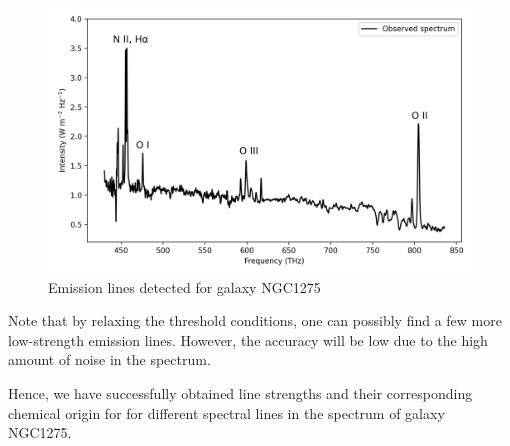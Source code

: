 \begin{figure}[H]
    \centering
    \includegraphics[width=0.7\linewidth]{Figures/3/final.png}
    \caption{Emission lines detected for galaxy NGC1275}
\label{galaxy_summary_pic}
\end{figure}

Note that by relaxing the threshold conditions, one can possibly find a few more low-strength emission lines. However, the accuracy will be low due to the high amount of noise in the spectrum.

Hence, we have successfully obtained line strengths and their corresponding chemical origin for for different spectral lines in the spectrum of galaxy NGC1275.